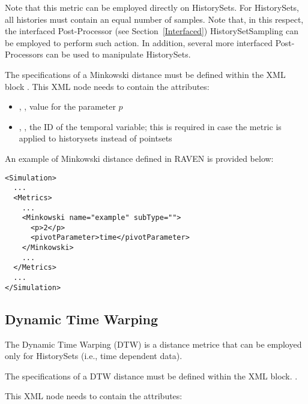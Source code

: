 Note that this metric can be employed directly on HistorySets.
For HistorySets, all histories must contain an equal number of samples. Note that, in this respect, the interfaced Post-Processor (see Section~\ref{Interfaced})
HistorySetSampling can be employed to perform such action. In addition, several more interfaced Post-Processors can be used to manipulate HistorySets.

The specifications of a Minkowski distance must be defined within the XML block
.
%
This XML node needs to contain the attributes:

\begin{itemize}
  \item {}, , value for the parameter $p$
  \item {}, , the ID of the temporal variable; this is required in case the metric is applied to historysets instead of pointsets
\end{itemize}

An example of Minkowski distance defined in RAVEN is provided below:
\begin{lstlisting}[style=XML]
<Simulation>
  ...
  <Metrics>
    ...
    <Minkowski name="example" subType="">
      <p>2</p>
      <pivotParameter>time</pivotParameter>
    </Minkowski>
    ...
  </Metrics>
  ...
</Simulation>
\end{lstlisting}


\subsection{Dynamic Time Warping}
\label{subsection:DTW}
The Dynamic Time Warping (DTW) is a distance metrice that can be employed only for HistorySets (i.e., time dependent data).

The specifications of a DTW distance must be defined within the XML block.
.

This XML node needs to contain the attributes:


